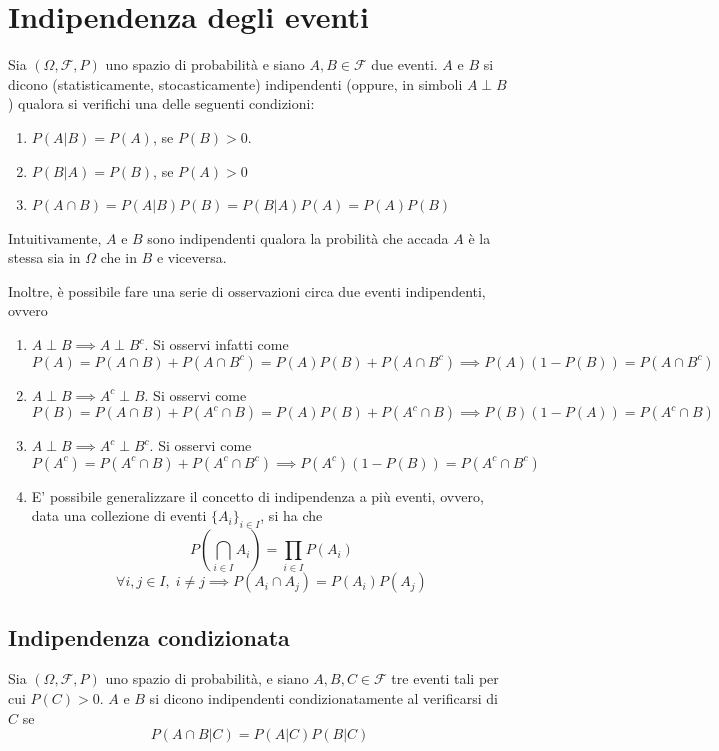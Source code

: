     \section{Indipendenza degli eventi}
        Sia $(\Omega, \mathcal{F}, P)$ uno spazio di probabilità e siano $A, B \in \mathcal{F}$ due eventi.
        $A$ e $B$ si dicono (statisticamente, stocasticamente) indipendenti (oppure, in simboli $A \perp B$) qualora si verifichi una delle seguenti condizioni:
        \begin{enumerate}
            \item $P(A | B) = P(A)$, se $P(B) > 0$.
            \item $P(B | A) = P(B)$, se $P(A) > 0$
            \item $P(A \cap B) = P(A | B)P(B) = P(B | A)P(A) = P(A)P(B)$
        \end{enumerate}
        Intuitivamente, $A$ e $B$ sono indipendenti qualora la probilità che accada $A$ è la stessa sia in $\Omega$ che in $B$ e viceversa.

        Inoltre, è possibile fare una serie di osservazioni circa due eventi indipendenti, ovvero
        \begin{enumerate}
            \item $A \perp B \implies A \perp B^{c}$. Si osservi infatti come
            \[
                P(A) = P(A \cap B) + P(A \cap B^{c}) = P(A)P(B) + P(A \cap B^{c}) \implies P(A)(1 - P(B)) = P(A \cap B^{c})
            \]
            \item $A \perp B \implies A^{c} \perp B$. Si osservi come
            \[
                P(B) = P(A \cap B) + P(A^{c} \cap B) = P(A)P(B) + P(A^{c} \cap B) \implies P(B)(1 - P(A)) = P(A^{c} \cap B)
            \]
            \item $A \perp B \implies A^{c} \perp B^{c}$. Si osservi come
            \[
                P(A^{c}) = P(A^{c} \cap B) + P(A^{c} \cap B^{c}) \implies P(A^{c})(1 - P(B)) = P(A^{c} \cap B^{c})
            \]
            \item E' possibile generalizzare il concetto di indipendenza a più eventi, ovvero, data una collezione di eventi $\{A_{i}\}_{i \in I}$, si ha che
            \[
                P\left(\bigcap_{i \in I} A_{i}\right) = \prod_{i \in I} P(A_{i})
            \]
            \[
                \forall i, j \in I, \; i \neq j \implies P(A_{i} \cap A_{j}) = P(A_{i})P(A_{j})
            \]
        \end{enumerate}

        \subsection{Indipendenza condizionata}
            Sia $(\Omega, \mathcal{F}, P)$ uno spazio di probabilità, e siano $A, B, C \in \mathcal{F}$ tre eventi tali per cui $P(C) > 0$.
            $A$ e $B$ si dicono indipendenti condizionatamente al verificarsi di $C$ se
            \[
                P(A \cap B | C) = P(A | C)P(B | C)
            \]




